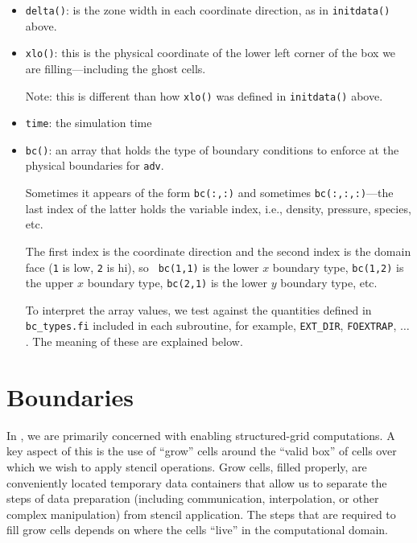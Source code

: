 \begin{itemize}
\begin{itemize}
  \item {\tt delta()}: is the zone width in each coordinate direction,
    as in {\tt initdata()} above.

  \item {\tt xlo()}: this is the physical coordinate of the lower
    left corner of the box we are filling---including the ghost cells.

    Note: this is different than how {\tt xlo()} was defined in
    {\tt initdata()} above.

  \item {\tt time}: the simulation time

  \item {\tt bc()}: an array that holds the type of boundary conditions
    to enforce at the physical boundaries for {\tt adv}.

    Sometimes it appears of the form {\tt bc(:,:)} and sometimes
    {\tt bc(:,:,:)}---the last index of the latter holds the variable
    index, i.e., density, pressure, species, etc.

    The first index is the coordinate direction and the second index
    is the domain face ({\tt 1} is low, {\tt 2} is hi), so {\tt
    bc(1,1)} is the lower $x$ boundary type, {\tt bc(1,2)} is
    the upper $x$ boundary type, {\tt bc(2,1)} is the lower
    $y$ boundary type, etc.

    To interpret the array values, we test against the quantities
    defined in {\tt bc\_types.fi} included in each subroutine,
    for example, {\tt EXT\_DIR}, {\tt FOEXTRAP}, $\ldots$.  The
    meaning of these are explained below.
      
  \end{itemize}
    
\end{itemize}


\section{Boundaries}
In \amrex, we are primarily concerned with enabling structured-grid
computations.  A key aspect of this is the use of ``grow'' cells
around the ``valid box'' of cells over which we wish to apply stencil operations.
Grow cells, filled properly, are conveniently located temporary 
data containers that allow us to separate the steps of data preparation
(including communication, interpolation, or other complex manipulation)
from stencil application.  The steps that are required to fill grow cells
depends on where the cells ``live'' in the computational domain.

